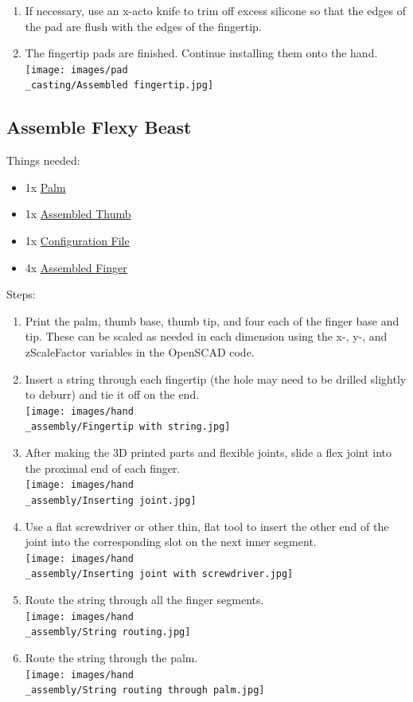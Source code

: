 \documentclass[11pt]{article}
\begin{document}
\begin{enumerate}
\item If necessary, use an x-acto knife to trim off excess silicone so that the edges of the pad are flush with the edges of the fingertip.
\item The fingertip pads are finished. Continue installing them onto the hand.\\ \texttt{[image: images/pad\\\_casting/Assembled fingertip.jpg]}
\end{enumerate}

\subsection{Assemble Flexy Beast}
Things needed:
\begin{itemize}
\item 1x \hyperlink{thing_palm}{Palm}
\item 1x \hyperlink{thing_thumb\_assembly}{Assembled Thumb}
\item 1x \hyperlink{thing_config\_file}{Configuration File}
\item 4x \hyperlink{thing_finger\_assembly}{Assembled Finger}
\end{itemize}
Steps:
\begin{enumerate}
\item Print the palm, thumb base, thumb tip, and four each of the finger base and tip. These can be scaled as needed in each dimension using the x-, y-, and zScaleFactor variables in the OpenSCAD code.
\item Insert a string through each fingertip (the hole may need to be drilled slightly to deburr) and tie it off on the end.\\ \texttt{[image: images/hand\\\_assembly/Fingertip with string.jpg]}
\item After making the 3D printed parts and flexible joints, slide a flex joint into the proximal end of each finger.\\ \texttt{[image: images/hand\\\_assembly/Inserting joint.jpg]}
\item Use a flat screwdriver or other thin, flat tool to insert the other end of the joint into the corresponding slot on the next inner segment.\\ \texttt{[image: images/hand\\\_assembly/Inserting joint with screwdriver.jpg]}
\item Route the string through all the finger segments.\\ \texttt{[image: images/hand\\\_assembly/String routing.jpg]}
\item Route the string through the palm.\\ \texttt{[image: images/hand\\\_assembly/String routing through palm.jpg]}
\end{enumerate}

\newpage
\end{document}
